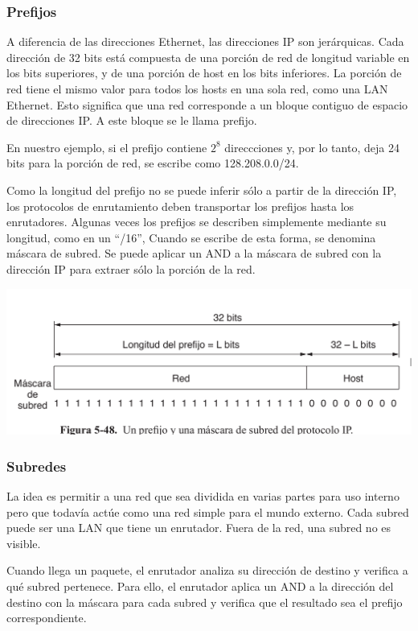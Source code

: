\documentclass[10pt,a4paper]{report}
\begin{document}
	\subsubsection{Prefijos}
	A diferencia de las direcciones Ethernet, las direcciones IP son jerárquicas. Cada dirección de 32 bits está
	compuesta de una porción de red de longitud variable en los bits superiores, y de una porción de host en
	los bits inferiores. La porción de red tiene el mismo valor para todos los hosts en una sola red, como una
	LAN Ethernet. Esto significa que una red corresponde a un bloque contiguo de espacio de direcciones IP.
	A este bloque se le llama prefijo.
	\par En nuestro ejemplo, si el prefijo contiene $ 2^{8}$ direccciones y, por lo
	tanto, deja 24 bits para la porción de red, se escribe como 128.208.0.0/24.
	\par Como la longitud del prefijo no se puede inferir sólo a partir de la dirección IP, los protocolos de enrutamiento deben transportar los prefijos hasta los enrutadores. Algunas veces los prefijos se
describen simplemente mediante su longitud, como en un “/16”, Cuando se escribe
de esta forma, se denomina máscara de subred. Se puede aplicar un AND a la máscara de subred
con la dirección IP para extraer sólo la porción de la red.

	\begin{center}
		\includegraphics[scale=0.3]{./imagenes/prefijomascara.png} 
	\end{center}

	\subsubsection{Subredes}
	
	La idea es permitir a una red que sea dividida en varias partes para uso interno pero que todavía actúe como una red simple para el mundo externo.
	Cada subred puede ser una LAN que tiene un enrutador. Fuera de la red, una subred no es visible.	
	\par Cuando llega un paquete, el enrutador analiza su dirección de destino y verifica a qué subred pertenece. Para ello, el enrutador aplica un AND a la dirección del destino con la máscara para cada subred y verifica que el resultado sea el prefijo correspondiente.
	
\end{document}
